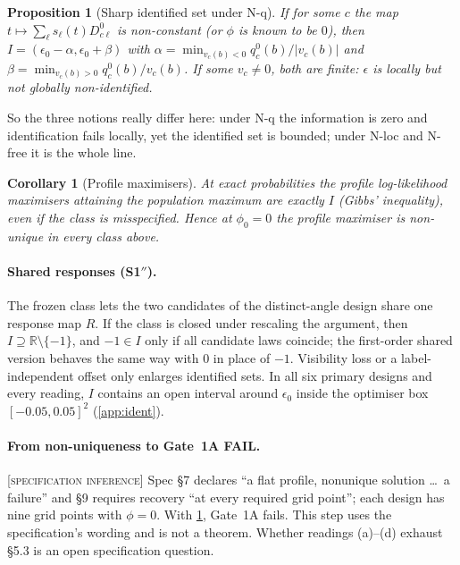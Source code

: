 \documentclass[10pt,twocolumn]{article}
\newtheorem{proposition}[theorem]{Proposition}
\newtheorem{corollary}[theorem]{Corollary}
\theoremstyle{definition}
\theoremstyle{remark}
\newcommand{\status}[1]{\hfill{\footnotesize\upshape\textsc{[#1]}}}
\newcommand{\R}{\mathbb{R}}
\newcommand{\eps}{\epsilon}
\begin{document}
\begin{proposition}[Sharp identified set under N-q]\label{prop:sharp}
If for some $c$ the map $t\mapsto\sum_\ell s_\ell(t)D^0_{c\ell}$ is non-constant (or $\phi$ is known to be $0$), then $I=(\eps_0-\alpha,\eps_0+\beta)$ with $\alpha=\min_{v_c(b)<0}q^0_c(b)/|v_c(b)|$ and $\beta=\min_{v_c(b)>0}q^0_c(b)/v_c(b)$. If some $v_c\neq0$, both are finite: $\eps$ is locally but \emph{not} globally non-identified.
\end{proposition}

So the three notions really differ here: under N-q the information is zero and identification fails locally, yet the identified set is bounded; under N-loc and N-free it is the whole line.

\begin{corollary}[Profile maximisers]\label{cor:gibbs}
At exact probabilities the profile log-likelihood maximisers attaining the population maximum are exactly $I$ (Gibbs' inequality), even if the class is misspecified. Hence at $\phi_0=0$ the profile maximiser is non-unique in every class above.
\end{corollary}

\paragraph{Shared responses (S1$''$).} The frozen class lets the two candidates of the distinct-angle design share one response map $R$. If the class is closed under rescaling the argument, then $I\supseteq\R\setminus\{-1\}$, and $-1\in I$ only if all candidate laws coincide; the first-order shared version behaves the same way with $0$ in place of $-1$. Visibility loss or a label-independent offset only enlarges identified sets. In all six primary designs and every reading, $I$ contains an open interval around $\eps_0$ inside the optimiser box $[-0.05,0.05]^2$ (\cref{app:ident}).

\paragraph{From non-uniqueness to Gate~1A FAIL.}\status{specification inference} Spec §7 declares ``a flat profile, nonunique solution \dots\ a failure'' and §9 requires recovery ``at every required grid point''; each design has nine grid points with $\phi=0$. With \cref{cor:gibbs}, Gate~1A fails. This step uses the specification's wording and is not a theorem. Whether readings (a)--(d) exhaust §5.3 is an open specification question.
\end{document}
